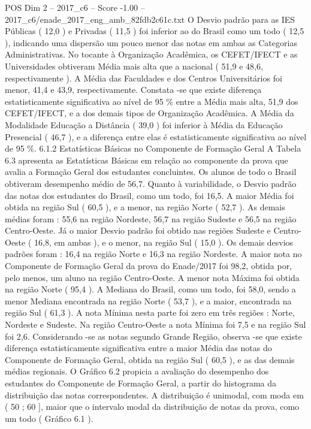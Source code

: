 \begin{textsample}{POS Dim 2 – 2017\_c6 – Score -1.00 – 2017\_c6/enade\_2017\_eng\_amb\_82fdb2c61c.txt}
O Desvio padrão para as IES Públicas ( 12,0 ) e Privadas ( 11,5 ) foi inferior ao do Brasil como um todo ( 12,5 ), indicando uma dispersão um pouco menor das notas em ambas as Categorias Administrativas.
No tocante à Organização Acadêmica, os CEFET/IFECT e as Universidades obtiveram Média mais alta que a nacional ( 51,9 e 48,6, respectivamente ).
A Média das Faculdades e dos Centros Universitários foi menor, 41,4 e 43,9, respectivamente.
Constata -se que existe diferença estatisticamente significativa ao nível de 95 \% entre a Média mais alta, 51,9 dos CEFET/IFECT, e a dos demais tipos de Organização Acadêmica.
A Média da Modalidade Educação a Distância ( 39,0 ) foi inferior à Média da Educação Presencial ( 46,7 ), e a diferença entre elas é estatisticamente significativa ao nível de 95 \%. 6.1.2 Estatísticas Básicas no Componente de Formação Geral A Tabela 6.3 apresenta as Estatísticas Básicas em relação ao componente da prova que avalia a Formação Geral dos estudantes concluintes.
Os alunos de todo o Brasil obtiveram desempenho médio de 56,7.
Quanto à variabilidade, o Desvio padrão das notas dos estudantes do Brasil, como um todo, foi 16,5.
A maior Média foi obtida na região Sul ( 60,5 ), e a menor, na região Norte ( 52,7 ).
As demais médias foram : 55,6 na região Nordeste, 56,7 na região Sudeste e 56,5 na região Centro-Oeste.
Já o maior Desvio padrão foi obtido nas regiões Sudeste e Centro-Oeste ( 16,8, em ambas ), e o menor, na região Sul ( 15,0 ).
Os demais desvios padrões foram : 16,4 na região Norte e 16,3 na região Nordeste.
A maior nota no Componente de Formação Geral da prova do Enade/2017 foi 98,2, obtida por, pelo menos, um aluno na região Centro-Oeste.
A menor nota Máxima foi obtida na região Norte ( 95,4 ).
A Mediana do Brasil, como um todo, foi 58,0, sendo a menor Mediana encontrada na região Norte ( 53,7 ), e a maior, encontrada na região Sul ( 61,3 ).
A nota Mínima nesta parte foi zero em três regiões : Norte, Nordeste e Sudeste.
Na região Centro-Oeste a nota Mínima foi 7,5 e na região Sul foi 2,6.
Considerando -se as notas segundo Grande Região, observa -se que existe diferença estatisticamente significativa entre a maior Média das notas do Componente de Formação Geral, obtida na região Sul ( 60,5 ), e as das demais médias regionais.
O Gráfico 6.2 propicia a avaliação do desempenho dos estudantes do Componente de Formação Geral, a partir do histograma da distribuição das notas correspondentes.
A distribuição é unimodal, com moda em ( 50 ; 60 ], maior que o intervalo modal da distribuição de notas da prova, como um todo ( Gráfico 6.1 ).

\end{textsample}
